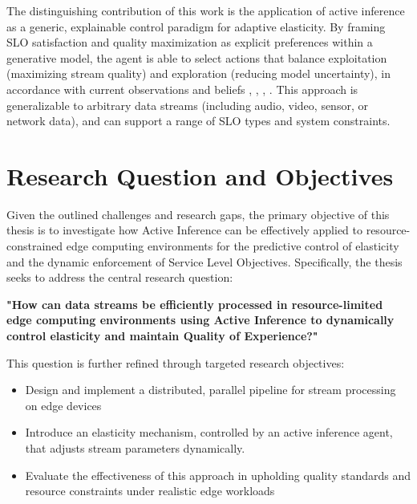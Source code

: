 The distinguishing contribution of this work is the application of active inference as a generic,
explainable control paradigm for adaptive elasticity. By framing SLO satisfaction and quality maximization as explicit preferences within a generative model, the agent is able to select actions that balance exploitation (maximizing stream quality) and exploration (reducing model uncertainty), in accordance with current observations and beliefs \cite{lanillos_active_2021}, \cite{danilenka_adaptive_2025}, \cite{casamayor_pujol_deepslos_2024}, \cite{sedlak_adaptive_2024}. This approach is generalizable to arbitrary data streams (including audio, video, sensor, or network
data), and can support a range of SLO types and system constraints.

\section{Research Question and Objectives}
Given the outlined challenges and research gaps, the primary objective of this thesis is to
investigate how Active Inference can be effectively applied to resource-constrained edge
computing environments for the predictive control of elasticity and the dynamic enforcement of
Service Level Objectives. Specifically, the thesis seeks to address the central research question:

\textbf{"How can data streams be efficiently processed in resource-limited edge computing
environments using Active Inference to dynamically control elasticity and maintain Quality of Experience?"}

This question is further refined through targeted research objectives:
\begin{itemize}
  \item Design and implement a distributed, parallel pipeline for stream processing on edge
devices
  \item Introduce an elasticity mechanism, controlled by an active inference agent, that
adjusts stream parameters dynamically.
  \item Evaluate the effectiveness of this approach in upholding quality standards
and resource constraints under realistic edge workloads
\end{itemize}